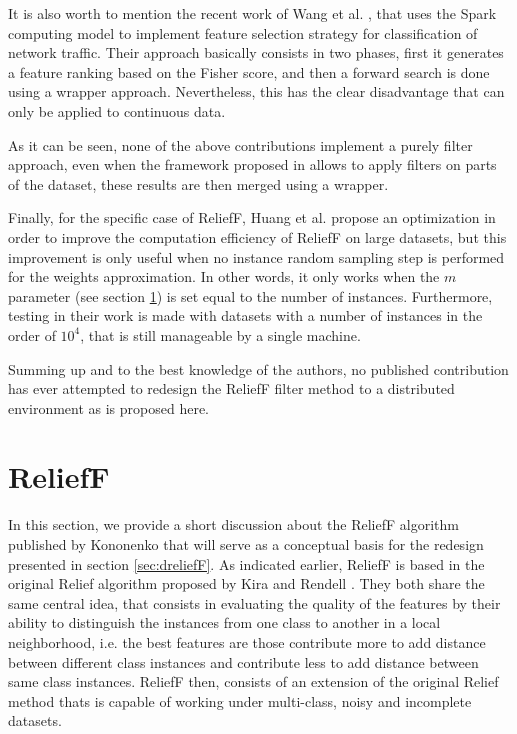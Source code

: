 It is also worth to mention the recent work of Wang et al. \cite{Wang2016}, that uses the Spark computing model to implement feature selection strategy for classification of network traffic. Their approach basically consists in two phases, first it generates a feature ranking based on the Fisher score, and then a forward search is done using a wrapper approach. Nevertheless, this has the clear disadvantage that can only be applied to continuous data.

As it can be seen, none of the above contributions implement a purely filter approach, even when the framework proposed in \cite{Bolon-Canedo2015} allows to apply filters on parts of the dataset, these results are then merged using a wrapper.

Finally, for the specific case of ReliefF, Huang et al. \cite{Huang2009} propose an optimization in order to improve the computation efficiency of ReliefF on large datasets, but this improvement is only useful when no instance random sampling step is performed for the weights approximation. In other words, it only works when the $m$ parameter (see section \ref{sec:reliefF}) is set equal to the number of instances. Furthermore, testing in their work is made with datasets with a number of instances in the order of $10^4$, that is still manageable by a single machine.

Summing up and to the best knowledge of the authors, no published contribution has ever attempted to redesign the ReliefF filter method to a distributed environment as is proposed here.

\section{ReliefF}
\label{sec:reliefF}

In this section, we provide a short discussion about the ReliefF algorithm published by Kononenko \cite{Kononenko1994} that will serve as a conceptual basis for the redesign presented in section \ref{sec:dreliefF}. As indicated earlier, ReliefF is based in the original Relief algorithm proposed by Kira and Rendell \cite{Kira1992}. They both share the same central idea, that consists in evaluating the quality of the features by their ability to distinguish the instances from one class to another in a local neighborhood, i.e. the best features are those contribute more to add distance between different class instances and contribute less to add distance between same class instances. ReliefF then, consists of an extension of the original Relief method thats is capable of working under multi-class, noisy and incomplete datasets.

